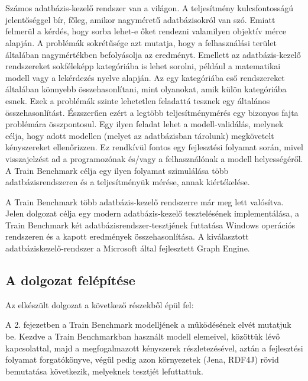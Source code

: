 \chapter{\bevezetes}

Számos adatbázis-kezelő rendszer van a világon. A teljesítmény kulcsfontosságú jelentőséggel bír, főleg, amikor nagyméretű adatbázisokról van szó. Emiatt felmerül a kérdés, hogy sorba lehet-e őket rendezni valamilyen objektív mérce alapján. A problémák sokrétűsége azt mutatja, hogy a felhasználási terület általában nagymértékben befolyásolja az eredményt. Emellett az adatbázis-kezelő rendszereket sokféleképp kategóriába is lehet sorolni, például a matematikai modell vagy a lekérdezés nyelve alapján. Az egy kategóriába eső rendszereket általában könnyebb összehasonlítani, mint olyanokat, amik külön kategóriába esnek. Ezek a problémák szinte lehetetlen feladattá tesznek egy általános összehasonlítást. Észszerűen ezért a legtöbb teljesítménymérés egy bizonyos fajta problémára összpontosul. Egy ilyen feladat lehet a modell-validálás, melynek célja, hogy adott modellen (melyet az adatbázisban tárolunk) megkövetelt kényszereket ellenőrizzen. Ez rendkívül fontos egy fejlesztési folyamat során, mivel visszajelzést ad a programozónak és/vagy a felhasználónak a modell helyességéről. A Train Benchmark célja egy ilyen folyamat szimulálása több adatbázisrendszeren és a teljesítményük mérése, annak kiértékelése.

A Train Benchmark több adatbázis-kezelő rendszerre már meg lett valósítva. Jelen dolgozat célja egy modern adatbázis-kezelő tesztelésének implementálása, a Train Benchmark két adatbázisrendszer-tesztjének futtatása Windows operációs rendszeren és a kapott eredmények összehasonlítása. A kiválasztott adatbáziskezelő-rendszer a Microsoft által fejlesztett Graph Engine.

\section{A dolgozat felépítése}

Az elkészült dolgozat a következő részekből épül fel:

A 2. fejezetben a Train Benchmark modelljének a működésének elvét mutatjuk be. Kezdve a Train Benchmarkban használt modell elemeivel, közöttük lévő kapcsolattal, majd a megfogalmazott kényszerek részletezésével, aztán a fejlesztési folyamat forgatókönyve, végül pedig azon környezetek (Jena, RDF4J) rövid bemutatása következik, melyeknek tesztjét lefuttattuk.

